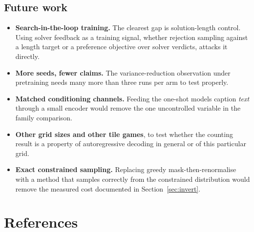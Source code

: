 \documentclass[11pt,a4paper]{report}
\begin{document}
\section{Future work}

\begin{itemize}[leftmargin=1.5em,itemsep=2pt]
\item \textbf{Search-in-the-loop training.} The clearest gap is solution-length
      control. Using solver feedback as a training signal, whether rejection
      sampling against a length target or a preference objective over solver
      verdicts, attacks it directly.
\item \textbf{More seeds, fewer claims.} The variance-reduction observation under
      pretraining needs many more than three runs per arm to test properly.
\item \textbf{Matched conditioning channels.} Feeding the one-shot models caption
      \emph{text} through a small encoder would remove the one uncontrolled
      variable in the family comparison.
\item \textbf{Other grid sizes and other tile games}, to test whether the
      counting result is a property of autoregressive decoding in general or of
      this particular grid.
\item \textbf{Exact constrained sampling.} Replacing greedy
      mask-then-renormalise with a method that samples correctly from the
      constrained distribution would remove the measured cost documented in
      Section~\ref{sec:invert}.
\end{itemize}

\chapter*{References}
\end{document}
